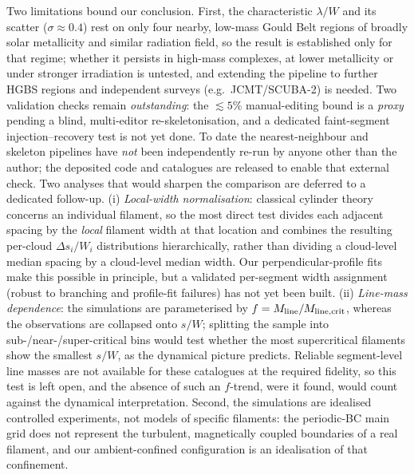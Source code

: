 \documentclass[usenatbib,twoside,twocolumn]{mnras}
\begin{document}
Two limitations bound our conclusion. First, the characteristic $\lambda/W$ and its scatter ($\sigma\approx0.4$) rest on only four nearby, low-mass Gould Belt regions of broadly solar metallicity and similar radiation field, so the result is established only for that regime; whether it persists in high-mass complexes, at lower metallicity or under stronger irradiation is untested, and extending the pipeline to further HGBS regions and independent surveys (e.g.\ JCMT/SCUBA-2) is needed. Two validation checks remain \emph{outstanding}: the $\lesssim5\%$ manual-editing bound is a \emph{proxy} pending a blind, multi-editor re-skeletonisation, and a dedicated faint-segment injection--recovery test is not yet done. To date the nearest-neighbour and skeleton pipelines have \emph{not} been independently re-run by anyone other than the author; the deposited code and catalogues are released to enable that external check. Two analyses that would sharpen the comparison are deferred to a dedicated follow-up. (i) \emph{Local-width normalisation}: classical cylinder theory concerns an individual filament, so the most direct test divides each adjacent spacing by the \emph{local} filament width at that location and combines the resulting per-cloud $\Delta s_i/W_i$ distributions hierarchically, rather than dividing a cloud-level median spacing by a cloud-level median width. Our perpendicular-profile fits make this possible in principle, but a validated per-segment width assignment (robust to branching and profile-fit failures) has not yet been built. (ii) \emph{Line-mass dependence}: the simulations are parameterised by $f=M_{\rm line}/M_{\rm line,crit}$, whereas the observations are collapsed onto $s/W$; splitting the sample into sub-/near-/super-critical bins would test whether the most supercritical filaments show the smallest $s/W$, as the dynamical picture predicts. Reliable segment-level line masses are not available for these catalogues at the required fidelity, so this test is left open, and the absence of such an $f$-trend, were it found, would count against the dynamical interpretation. Second, the simulations are idealised controlled experiments, not models of specific filaments: the periodic-BC main grid does not represent the turbulent, magnetically coupled boundaries of a real filament, and our ambient-confined configuration is an idealisation of that confinement.
\end{document}
